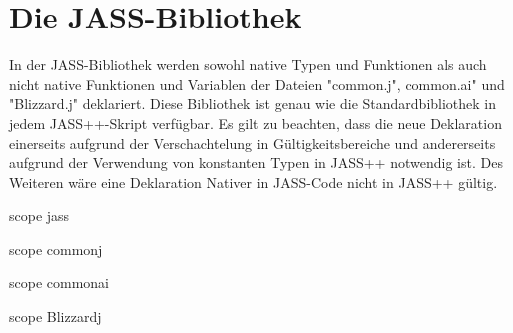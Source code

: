 \chapter{Die JASS-Bibliothek}
In der JASS-Bibliothek werden sowohl native Typen und Funktionen als auch nicht native Funktionen und Variablen der Dateien 
"common.j", common.ai" und "Blizzard.j" deklariert.
Diese Bibliothek ist genau wie die Standardbibliothek in jedem JASS++-Skript verfügbar.
Es gilt zu beachten, dass die neue Deklaration einerseits aufgrund der Verschachtelung in Gültigkeitsbereiche und andererseits
aufgrund der Verwendung von konstanten Typen in JASS++ notwendig ist.
Des Weiteren wäre eine Deklaration Nativer in JASS-Code nicht in JASS++ gültig.

scope jass
{
	scope commonj
	{
	}
	
	scope commonai
	{
	}
	
	scope Blizzardj
	{
	}
} 
